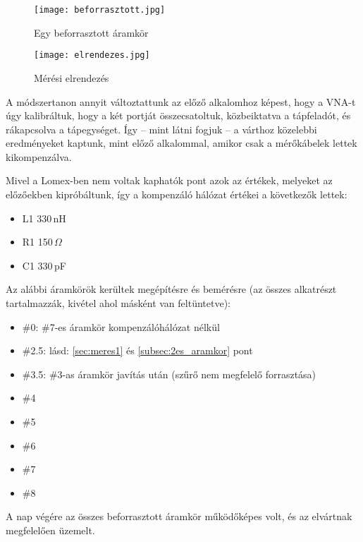 \begin{figure}[!ht]
	\centering
	\begin{minipage}[b]{0.49\textwidth}
		\texttt{[image: beforrasztott.jpg]}
		\caption{Egy beforrasztott áramkör}
		\label{fig:beforrasztott}
	\end{minipage}
	\begin{minipage}[b]{0.49\textwidth}
		\texttt{[image: elrendezes.jpg]}
		\caption{Mérési elrendezés}
		\label{fig:elrendezes}
	\end{minipage}
\end{figure}

A módszertanon annyit változtattunk az előző alkalomhoz képest, hogy a VNA-t úgy kalibráltuk, hogy a két portját összecsatoltuk, közbeiktatva a tápfeladót, és rákapcsolva a tápegységet. Így -- mint látni fogjuk -- a várthoz közelebbi eredményeket kaptunk, mint előző alkalommal, amikor csak a mérőkábelek lettek kikompenzálva.

Mivel a Lomex-ben nem voltak kaphatók pont azok az értékek, melyeket az előzőekben kipróbáltunk, így a kompenzáló hálózat értékei a következők lettek:

\begin{itemize}
	\item L1 330\,nH\cite{L1}
	\item R1 150\,$\Omega$\cite{R1}
	\item C1 330\,pF\cite{C1}
\end{itemize}

Az alábbi áramkörök kerültek megépítésre és bemérésre (az összes alkatrészt tartalmazzák, kivétel ahol másként van feltüntetve):

\begin{itemize}
\item \#0: \#7-es áramkör kompenzálóhálózat nélkül
\item \#2.5: lásd: \ref{sec:meres1} és \ref{subsec:2es_aramkor} pont
\item \#3.5: \#3-as áramkör javítás után (szűrő nem megfelelő forrasztása)
\item \#4
\item \#5
\item \#6
\item \#7
\item \#8
\end{itemize}

A nap végére az összes beforrasztott áramkör működőképes volt, és az elvártnak megfelelően üzemelt.

